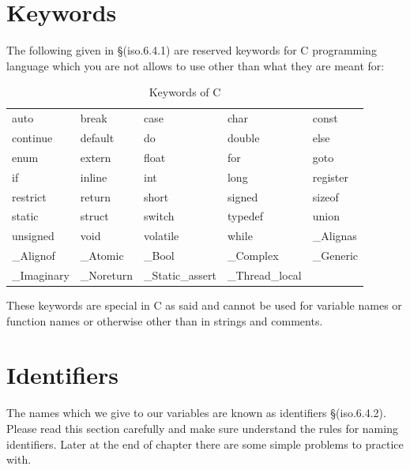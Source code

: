 \section{Keywords}
The following given in \S(iso.6.4.1) are reserved keywords for C programming language which you are not 
allows to use other than what they are meant for:
\begin{table}[H]
 \begin{center}
  \caption{Keywords of C}
  \begin{tabular}{l l l l l}
    auto & break & case & char & const\\
    continue & default & do & double & else\\
    enum & extern & float & for & goto\\
    if & inline & int & long & register\\
    restrict & return & short & signed & sizeof\\
    static & struct & switch & typedef  & union\\
    unsigned & void & volatile & while & \_Alignas\\
    \_Alignof& \_Atomic & \_Bool & \_Complex & \_Generic \\
    \_Imaginary & \_Noreturn & \_Static\_assert & \_Thread\_local\\
  \end{tabular}
 \end{center}
\end{table}

These keywords are special in C as said and cannot be used for variable names 
or function names or otherwise other than in strings and comments.

\section{Identifiers}
The names which we give to our variables are known as identifiers
\S(iso.6.4.2). Please read this section carefully and make sure understand
the rules for naming identifiers. Later at the end of chapter there are some
simple problems to practice with.

